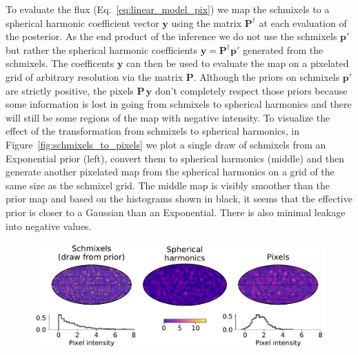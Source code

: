 \documentclass[modern]{aastex62}
\begin{document}
To evaluate the flux (Eq.~\ref{eq:linear_model_pix}) we map the schmixels to a spherical harmonic coefficient vector $\mathbf{y}$ using the matrix $\mathbf{P}^\dagger$ at each evaluation of the posterior.
As the end product of the inference we do not use the schmixels $\mathbf{p}'$ but rather the spherical harmonic coefficients $\mathbf{y}=\mathbf{P}^\dagger\mathbf{p}'$ generated from the schmixels.
The coefficents $\mathbf{y}$ can then be used to evaluate the map on a pixelated grid of arbitrary resolution via the matrix $\mathbf{P}$. 
Although the priors on schmixels $\mathbf{p}'$ are strictly positive, the pixels $\mathbf{P}\,\mathbf{y}$ don't completely respect those priors because some information is lost in going from schmixels to spherical harmonics  and there will still be some regions of the map with negative intensity.
To visualize the effect of the transformation from schmixels to spherical harmonics, in Figure~\ref{fig:schmixels_to_pixels} we plot a single draw of schmixels from an Exponential prior (left), convert them to spherical harmonics (middle) and then generate another pixelated map from the spherical harmonics on a grid of the same size as the schmixel grid.
The middle map is visibly smoother than the prior map and based on the histograms shown in black, it seems that the effective prior is closer to a Gaussian than an Exponential.
There is also minimal leakage into negative values.

\begin{figure}[h!]
    \begin{centering}
    \includegraphics[width=1.\linewidth]{figures/schmixels_to_pixels.pdf}
    \end{centering}
\end{figure}
\end{document}
